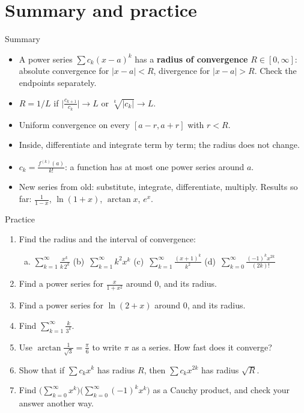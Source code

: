 \documentclass{wosm-slides}
\begin{document}
\section{Summary and practice}

\begin{frame}{Summary}
  \begin{itemize}
    \item A power series $\sum c_k (x - a)^k$ has a \textbf{radius of convergence}
      $R \in [0, \infty]$: absolute convergence for $|x - a| < R$, divergence for
      $|x - a| > R$. Check the endpoints separately.
    \item $R = 1/L$ if $\bigl|\frac{c_{k+1}}{c_k}\bigr| \to L$ or $\sqrt[k]{|c_k|} \to L$.
    \item Uniform convergence on every $[a - r, a + r]$ with $r < R$.
    \item Inside, differentiate and integrate term by term; the radius does not change.
    \item $c_k = \frac{f^{(k)}(a)}{k!}$: a function has at most one power series around $a$.
    \item New series from old: substitute, integrate, differentiate, multiply.
      Results so far: $\frac{1}{1-x}$, $\ln(1+x)$, $\arctan x$, $e^x$.
  \end{itemize}
\end{frame}

\begin{frame}{Practice}
  \small
  \begin{enumerate}
    \item Find the radius and the interval of convergence:
      \begin{enumerate}[(a)]
        \item $\sum_{k=1}^\infty \frac{x^k}{k\, 2^k}$ \qquad
          (b)\ $\sum_{k=1}^\infty k^2 x^k$ \qquad
          (c)\ $\sum_{k=1}^\infty \frac{(x+1)^k}{k^2}$ \qquad
          (d)\ $\sum_{k=0}^\infty \frac{(-1)^k x^{2k}}{(2k)!}$
      \end{enumerate}
    \item Find a power series for $\frac{x}{1+x^2}$ around $0$, and its radius.
    \item Find a power series for $\ln(2 + x)$ around $0$, and its radius.
    \item Find $\sum_{k=1}^\infty \frac{k}{3^k}$.
    \item Use $\arctan\frac{1}{\sqrt3} = \frac\pi6$ to write $\pi$ as a series. How fast does it
      converge?
    \item Show that if $\sum c_k x^k$ has radius $R$, then $\sum c_k x^{2k}$ has radius $\sqrt R$.
    \item Find $\bigl(\sum_{k=0}^\infty x^k\bigr)\bigl(\sum_{k=0}^\infty (-1)^k x^k\bigr)$
      as a Cauchy product, and check your answer another way.
  \end{enumerate}
\end{frame}
\end{document}
